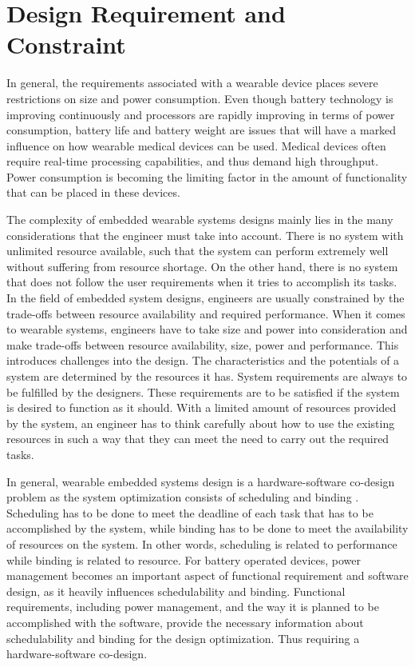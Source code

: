 \section {Design Requirement and Constraint} 

In general, the requirements associated with a wearable device
places severe restrictions on size and power consumption. Even though
battery technology is improving continuously and processors are
rapidly improving in terms of power consumption, battery life and
battery weight are issues that will have a marked influence on how
wearable medical devices can be used. Medical devices often require
real-time processing capabilities, and thus demand high throughput.
Power consumption is becoming the limiting factor in the amount of
functionality that can be placed in these devices. 

The complexity of embedded wearable systems designs mainly lies in
the many considerations that the engineer must take into account.
There is no system with unlimited resource available, such that the
system can perform extremely well without suffering from resource
shortage. On the other hand, there is no system that does not follow
the user requirements when it tries to accomplish its tasks. In the
field of embedded system designs, engineers are usually constrained
by the trade-offs between resource availability and required
performance. When it comes to wearable systems, engineers have to
take size and power into consideration and make trade-offs between
resource availability, size, power and performance. This introduces
challenges into the design. The characteristics and the potentials of
a system are determined by the resources it has. System requirements
are always to be fulfilled by the designers.  These requirements are
to be satisfied if the system is desired to function as it should.
With a limited amount of resources provided by the system, an
engineer has to think carefully about how to use the existing
resources in such a way that they can meet the need to carry out
the required tasks. 

In general, wearable embedded systems design is a hardware-software
co-design problem as the system optimization consists of scheduling
and binding \cite{sched_bind}.  Scheduling has to be done to meet the
deadline of each task that has to be accomplished by the system,
while binding has to be done to meet the availability of resources on
the system. In other words, scheduling is related to performance
while binding is related to resource. For battery operated devices,
power management becomes an important aspect of functional
requirement and software design, as it heavily influences
schedulability and binding.  Functional requirements, including power
management, and the way it is planned to be accomplished with the
software, provide the necessary information about schedulability and
binding for the design optimization. Thus requiring a
hardware-software co-design.

